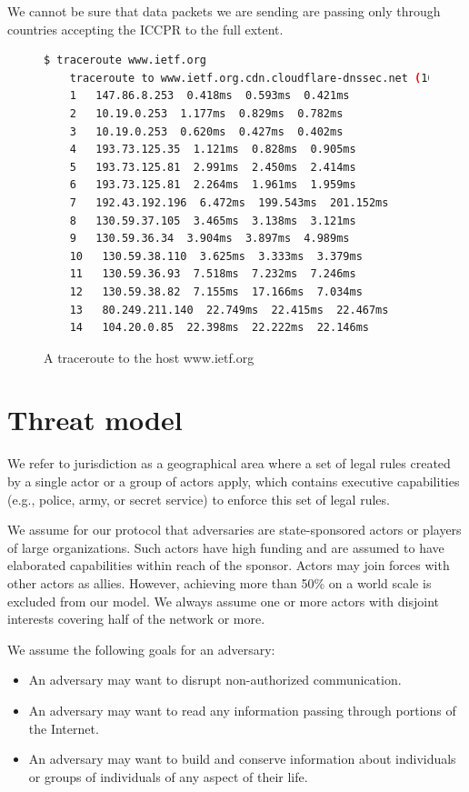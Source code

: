 We cannot be sure that data packets we are sending are passing only through countries accepting the ICCPR to the full extent.

\begin{figure}[H]
	\begin{lstlisting}[language=bash,breaklines=true,basicstyle=\tiny]
	$ traceroute www.ietf.org
	traceroute to www.ietf.org.cdn.cloudflare-dnssec.net (104.20.0.85), 64 hops max
	1   147.86.8.253  0.418ms  0.593ms  0.421ms
	2   10.19.0.253  1.177ms  0.829ms  0.782ms
	3   10.19.0.253  0.620ms  0.427ms  0.402ms
	4   193.73.125.35  1.121ms  0.828ms  0.905ms
	5   193.73.125.81  2.991ms  2.450ms  2.414ms
	6   193.73.125.81  2.264ms  1.961ms  1.959ms
	7   192.43.192.196  6.472ms  199.543ms  201.152ms
	8   130.59.37.105  3.465ms  3.138ms  3.121ms
	9   130.59.36.34  3.904ms  3.897ms  4.989ms
	10   130.59.38.110  3.625ms  3.333ms  3.379ms
	11   130.59.36.93  7.518ms  7.232ms  7.246ms
	12   130.59.38.82  7.155ms  17.166ms  7.034ms
	13   80.249.211.140  22.749ms  22.415ms  22.467ms
	14   104.20.0.85  22.398ms  22.222ms  22.146ms
	\end{lstlisting}
	\caption{A traceroute to the host www.ietf.org}
\end{figure}


\section{Threat model\label{sec:adversary}}
We refer to jurisdiction as a geographical area where a set of legal rules created by a single actor or a group of actors apply, which contains executive capabilities (e.g., police, army, or secret service) to enforce this set of legal rules.

We assume for our protocol that adversaries are state-sponsored actors or players of large organizations. Such actors have high funding and are assumed to have elaborated capabilities within reach of the sponsor. Actors may join forces with other actors as allies. However, achieving more than 50\% on a world scale is excluded from our model. We always assume one or more actors with disjoint interests covering half of the network or more. 

We assume the following goals for an adversary:
\begin{itemize}
	\item An adversary may want to disrupt non-authorized communication.
	\item An adversary may want to read any information passing through portions of the Internet.
	\item An adversary may want to build and conserve information about individuals or groups of individuals of any aspect of their life. 
\end{itemize}

